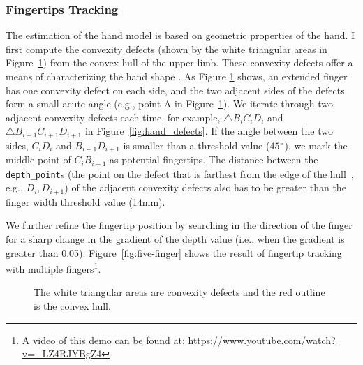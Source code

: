 \subsubsection{Fingertips Tracking}
The estimation of the hand model is based on geometric
properties of the hand. I first compute the convexity defects (shown by
the white triangular areas in Figure~\ref{fig:convexity_defects})
from the convex hull of the upper limb.
These convexity defects offer a means of characterizing the hand shape
\cite{Opencv}. As Figure \ref{fig:convexity_defects} shows, an extended finger 
has one convexity defect on each side, and the two adjacent sides of the defects
form a small acute angle (e.g., point A in Figure~\ref{fig:convexity_defects}).
We iterate through two adjacent convexity defects each time, for example, 
$\bigtriangleup B_iC_iD_i$ and $\bigtriangleup B_{i+1}C_{i+1}D_{i+1}$ in
Figure~\ref{fig:hand_defects}. If the angle between the two sides, $C_iD_i$
and $B_{i+1}D_{i+1}$ is smaller than a threshold value ($45\,^{\circ}$), we mark
the middle point of $C_iB_{i+1}$ as potential fingertips. The distance between
the \texttt{depth\_point}s (the point on the defect that is farthest from the
edge of the hull~\cite{Opencv}, e.g., $D_i, D_{i+1}$) of the adjacent convexity
defects also has to be greater than the finger width threshold value (14mm).

We further refine the fingertip position by searching in the direction of the
finger for a sharp change in the gradient of the depth value (i.e., when
the gradient is greater than 0.05). Figure~\ref{fig:five-finger} shows the
result of fingertip tracking with multiple fingers\footnote{A video of this
demo can be found at: \url{https://www.youtube.com/watch?v=_LZ4RJYBgZ4}}.

\begin{figure}[tbh]
  \centering
  \caption{The white triangular areas are convexity defects and the red
  outline is the convex hull.}
  \label{fig:convexity_defects}
\end{figure}

